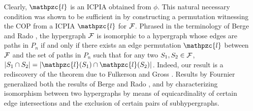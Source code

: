 \documentclass[envcountsect, envcountsame, 11pt]{../lib/llncs2e/llncs}
\def\cF{{\cal F}}
\def\cl{\mathpzc{l}}
\begin{document}
Clearly, $\cl$ is an ICPIA obtained from $\phi$.
This natural necessary condition was shown to be sufficient in \cite{nsnrs09} by constructing a permutation witnessing the COP from a ICPIA $\cl$ for $\cF$.   Phrased in the terminology of Berge and Rado \cite{br72}, the hypergraph $\cF$ is isomorphic to a hypergraph whose edges are  paths in $P_n$ if and only if 
there exists an edge permutation $\cl$ between $\cF$ and the set of paths in $P_n$ such that for any two $S_1, S_2 \in \cF$, $|S_1 \cap S_2| = |\cl(S_1) \cap \cl(S_2)|$.   Indeed, our result is a rediscovery of the theorem due to Fulkerson and Gross \cite{fg65}.  Results by Fournier \cite{fou80} 
generalized both the results of Berge and Rado \cite{br72}, and \cite{fg65} by  characterizing isomorphism between two hypergraphs by means of equicardinality of certain edge intersections and the exclusion of certain pairs of subhypergraphs. 
\end{document}
